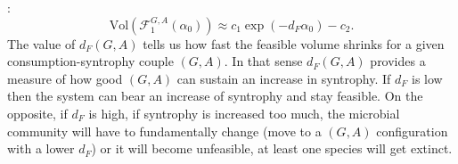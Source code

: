 \documentclass[12pt, titlepage]{report}
\begin{document}
  :
  \begin{equation}
\text{Vol}\left(\mathcal{F}_1^{G,A}(\alpha_0)\right) \approx c_1 \exp{\left(-d_F \alpha_0\right)} - c_2. \label{eq: feasibility results fit feasible volume}
  \end{equation}
  The value of $d_F(G,A)$ tells us how fast the feasible volume shrinks for a given consumption-syntrophy couple $(G,A)$. In that sense $d_F(G,A)$ provides a measure of how good $(G,A)$ can sustain an increase in syntrophy. %
  If $d_F$ is low then the system can bear an increase of syntrophy and stay feasible. On the opposite, if $d_F$ is high, if syntrophy is increased too much, the microbial community will have to fundamentally change (\eg move to a $(G,A)$ configuration with a lower $d_F$) or it will become unfeasible, \ie at least one species will get extinct.
\end{document}
